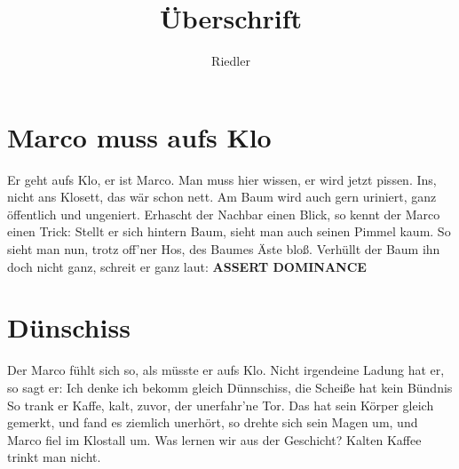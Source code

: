 \documentclass[11pt]{article}
\title{\textbf{Überschrift}}
\author{Riedler}
\date{}
\begin{document}
\maketitle
\thispagestyle{empty}

\section*{Marco muss aufs Klo}

Er geht aufs Klo, er ist Marco.\newline
Man muss hier wissen, er wird jetzt pissen.\newline
Ins, nicht ans Klosett, das wär schon nett.\newline
Am Baum wird auch gern uriniert, ganz öffentlich und ungeniert.\newline
Erhascht der Nachbar einen Blick, so kennt der Marco einen Trick:\newline
Stellt er sich hintern Baum, sieht man auch seinen Pimmel kaum.\newline
So sieht man nun, trotz off'ner Hos, des Baumes Äste bloß.\newline
Verhüllt der Baum ihn doch nicht ganz, schreit er ganz laut: \textbf{ASSERT DOMINANCE}

\section*{Dünschiss}

Der Marco fühlt sich so, als müsste er aufs Klo.\newline
Nicht irgendeine Ladung hat er, so sagt er:\newline
Ich denke ich bekomm gleich Dünnschiss, die Scheiße hat kein Bündnis\newline
So trank er Kaffe, kalt, zuvor, der unerfahr'ne Tor.\newline
Das hat sein Körper gleich gemerkt, und fand es ziemlich unerhört,\newline
so drehte sich sein Magen um, und Marco fiel im Klostall um.\newline
Was lernen wir aus der Geschicht? Kalten Kaffee trinkt man nicht.
\end{document}
